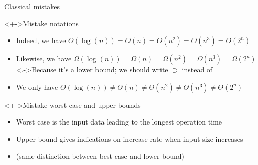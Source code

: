\begin{frame}{Classical mistakes}
  \begin{block}<+->{Mistake notations}
    \begin{itemize}
    \item Indeed, we have  $O(\log(n))=O(n)=O(n^2)=O(n^3)=O(2^n)$ \\
    \item Likewise, we have
      $\Omega(\log(n))=\Omega(n)=\Omega(n^2)=\Omega(n^3)=\Omega(2^n)$\\
      \visible<.->{{\small Because it's a lower bound; we should write
          $\supset$ instead of =}}
    \item We only have  $\Theta(\log(n))\neq\Theta(n)\neq\Theta(n^2)
      \neq\Theta(n^3)\neq\Theta(2^n)$\vspace{.3\baselineskip}
    \end{itemize}
  \end{block}

  \begin{block}<+->{Mistake worst case and upper bounds}
    \begin{itemize}
    \item Worst case is the input data leading to the longest operation time
    \item Upper bound gives indications on increase rate when input size
      increases 
    \item[] (same distinction between best case and lower bound)
    \end{itemize}
  \end{block}
\end{frame}
